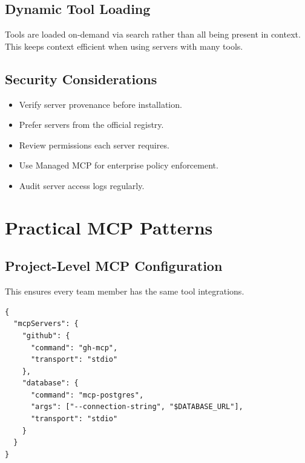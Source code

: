 \subsection{Dynamic Tool Loading}

 Tools are loaded on-demand via search rather than
all being present in context. This keeps context efficient when using
servers with many tools.

\subsection{Security Considerations}

\begin{warnbox}
\begin{itemize}
  \item Verify server provenance before installation.
  \item Prefer servers from the official registry.
  \item Review permissions each server requires.
  \item Use Managed MCP for enterprise policy enforcement.
  \item Audit server access logs regularly.
\end{itemize}
\end{warnbox}

\section{Practical MCP Patterns}
\label{sec:mcp-patterns}

\subsection{Project-Level MCP Configuration}

This ensures every team member has the same tool integrations.

\begin{verbatim}
{
  "mcpServers": {
    "github": {
      "command": "gh-mcp",
      "transport": "stdio"
    },
    "database": {
      "command": "mcp-postgres",
      "args": ["--connection-string", "$DATABASE_URL"],
      "transport": "stdio"
    }
  }
}
\end{verbatim}

